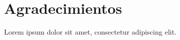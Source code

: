 \documentclass[11pt, oneside]{book}
\begin{document}
\chapter*{Agradecimientos}

\noindent Lorem ipsum dolor sit amet, consectetur adipiscing elit.




\tableofcontents


\listoftables

\listoffigures


\mainmatter %

\pagestyle{plain}
















\begin{appendix}



\end{appendix}

\end{document}
